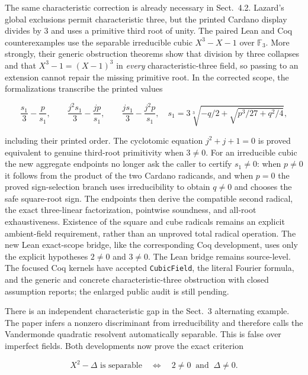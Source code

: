 \documentclass[11pt,a4paper,oneside]{article}
\begin{document}
The same characteristic correction is already necessary in Sect.~4.2.
Lazard's global exclusions permit characteristic three, but the printed
Cardano display divides by $3$ and uses a primitive third root of unity.
The paired Lean and Coq counterexamples use the separable irreducible cubic
$X^3-X-1$ over $\mathbb F_3$.  More strongly, their generic obstruction
theorems show that division by three collapses and that
$X^3-1=(X-1)^3$ in \emph{every} characteristic-three field, so passing to an
extension cannot repair the missing primitive root.  In the corrected scope,
the formalizations transcribe the printed values

\[
 \frac{s_1}{3}-\frac p{s_1},\qquad
 \frac{j^2s_1}{3}-\frac{jp}{s_1},\qquad
 \frac{js_1}{3}-\frac{j^2p}{s_1},
 \quad
 s_1=3\sqrt[3]{-q/2+\sqrt{p^3/27+q^2/4}},
\]

including their printed order.  The cyclotomic equation
$j^2+j+1=0$ is proved equivalent to genuine third-root primitivity when
$3\ne0$.  For an irreducible cubic the new aggregate endpoints no longer ask
the caller to certify $s_1\ne0$: when $p\ne0$ it follows from the product of
the two Cardano radicands, and when $p=0$ the proved sign-selection branch
uses irreducibility to obtain $q\ne0$ and chooses the safe square-root sign.
The endpoints then derive the compatible second radical, the exact
three-linear factorization, pointwise soundness, and all-root exhaustiveness.
Existence of the square and cube radicals remains an explicit ambient-field
requirement, rather than an unproved total radical operation.
The new Lean exact-scope bridge, like the corresponding Coq development,
uses only the explicit hypotheses $2\ne0$ and $3\ne0$.  The Lean bridge
remains source-level.  The focused Coq kernels have accepted
\texttt{CubicField}, the literal Fourier formula, and the generic and
concrete characteristic-three obstruction with closed assumption reports;
the enlarged public audit is still pending.

There is an independent characteristic gap in the Sect.~3 alternating
example.  The paper infers a nonzero discriminant from irreducibility and
therefore calls the Vandermonde quadratic resolvent automatically separable.
This is false over imperfect fields.  Both developments now prove the exact
criterion

\[
  X^2-\Delta\text{ is separable}
  \quad\Longleftrightarrow\quad
  2\ne0\ \text{ and }\ \Delta\ne0.
\]
\end{document}
